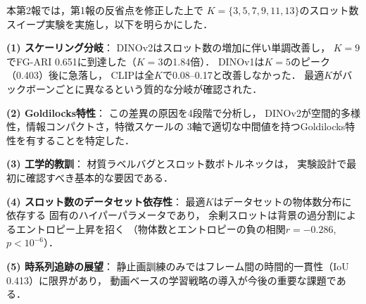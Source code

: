 \documentclass[dvipdfmx,twocolumn]{jarticle}
\begin{document}
本第2報では，第1報の反省点を修正した上で
$K{=}\{3, 5, 7, 9, 11, 13\}$のスロット数スイープ実験を実施し，以下を明らかにした．

\vspace{0.3em}
\noindent\textbf{(1) スケーリング分岐}：
DINOv2はスロット数の増加に伴い単調改善し，
$K{=}9$でFG-ARI 0.651に到達した（$K{=}3$の1.84倍）．
DINOv1は$K{=}5$のピーク（0.403）後に急落し，
CLIPは全$K$で0.08--0.17と改善しなかった．
最適$K$がバックボーンごとに異なるという質的な分岐が確認された．

\vspace{0.3em}
\noindent\textbf{(2) Goldilocks特性}：
この差異の原因を4段階で分析し，
DINOv2が空間的多様性，情報コンパクトさ，特徴スケールの
3軸で適切な中間値を持つGoldilocks特性を有することを特定した．

\vspace{0.3em}
\noindent\textbf{(3) 工学的教訓}：
材質ラベルバグとスロット数ボトルネックは，
実験設計で最初に確認すべき基本的な要因である．

\vspace{0.3em}
\noindent\textbf{(4) スロット数のデータセット依存性}：
最適$K$はデータセットの物体数分布に依存する
固有のハイパーパラメータであり，
余剰スロットは背景の過分割によるエントロピー上昇を招く
（物体数とエントロピーの負の相関$r{=}{-}0.286$, $p{<}10^{-6}$）．

\vspace{0.3em}
\noindent\textbf{(5) 時系列追跡の展望}：
静止画訓練のみではフレーム間の時間的一貫性（IoU 0.413）に限界があり，
動画ベースの学習戦略の導入が今後の重要な課題である．
\end{document}
